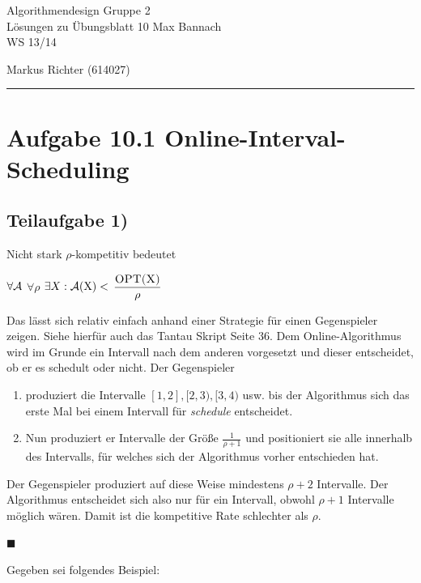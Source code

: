 \documentclass[a4paper, fontsize=10pt]{scrartcl}
\begin{document}
 

{\huge{Algorithmendesign} \hfill \large{ Gruppe 2}}\\  
{\large Lösungen zu Übungsblatt 10} \hfill Max Bannach\\
{\large WS 13/14}
\begin{flushright}Markus Richter (614027)\end{flushright}
\rule{\textwidth}{.3mm}

\section*{Aufgabe 10.1 Online-Interval-Scheduling}
\subsection*{Teilaufgabe 1)}

Nicht stark $\rho$-kompetitiv bedeutet\smallskip

  \begin{center}
    $\forall \cal{A}$ $\forall \rho$ $\exists X: \cal{A}(\textrm{X}) <$ $\dfrac{\textsc{OPT(X)}}{\rho}$
  \end{center}
\smallskip

Das lässt sich relativ einfach anhand einer Strategie für einen Gegenspieler zeigen. Siehe hierfür auch das Tantau Skript Seite 36. Dem Online-Algorithmus wird im Grunde ein Intervall nach dem anderen vorgesetzt und dieser entscheidet, ob er es schedult oder nicht. Der Gegenspieler
\begin{enumerate}
  \item produziert die Intervalle $[1,2], [2,3), [3,4)$ usw. bis der Algorithmus sich das erste Mal bei einem Intervall für \emph{schedule} entscheidet. 
  \item Nun produziert er Intervalle der Größe $\frac{1}{\rho+1}$ und positioniert sie alle innerhalb des Intervalls, für welches sich der Algorithmus vorher entschieden hat.
\end{enumerate}

Der Gegenspieler produziert auf diese Weise mindestens $\rho+2$ Intervalle. Der Algorithmus entscheidet sich also nur für ein Intervall, obwohl $\rho+1$ Intervalle möglich wären. Damit ist die kompetitive Rate schlechter als $\rho$. \begin{flushright}$\blacksquare$\end{flushright} \bigskip

Gegeben sei folgendes Beispiel:
\end{document}
